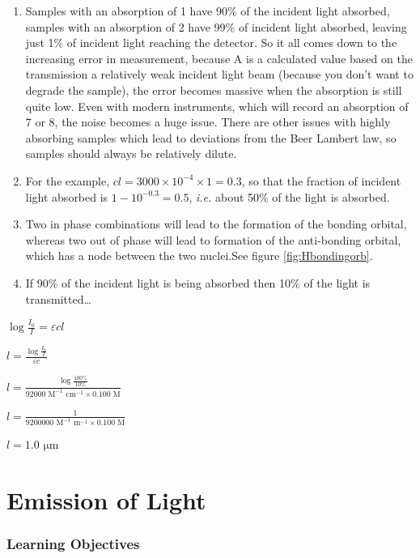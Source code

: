 \documentclass[
]{book}
\begin{document}
\begin{enumerate}
\def\labelenumi{\arabic{enumi}.}
\setcounter{enumi}{4}
\item
  Samples with an absorption of 1 have 90\% of the incident light absorbed, samples with an absorption of 2 have 99\% of incident light absorbed, leaving just 1\% of incident light reaching the detector. So it all comes down to the increasing error in measurement, because A is a calculated value based on the transmission a relatively weak incident light beam (because you don't want to degrade the sample), the error becomes massive when the absorption is still quite low. Even with modern instruments, which will record an absorption of 7 or 8, the noise becomes a huge issue. There are other issues with highly absorbing samples which lead to deviations from the Beer Lambert law, so samples should always be relatively dilute.
\item
  For the example, \(cl = 3000 \times 10^{-4} \times 1 = 0.3\), so that the fraction of incident light absorbed is
  \(1 - 10^{-0.3} = 0.5\), \emph{i.e.} about 50\% of the light is absorbed.
\item
  Two in phase combinations will lead to the formation of the bonding orbital, whereas two out of phase will lead to formation of the anti-bonding orbital, which has a node between the two nuclei.See figure \ref{fig:Hbondingorb}.
\item
  If 90\% of the incident light is being absorbed then 10\% of the light is transmitted\ldots{}
\end{enumerate}

\(\log \frac{I_0}{I}=\varepsilon cl\)

\(l=\frac{ \log \frac{I_0}{I}}{\varepsilon c}\)

\(l=\frac{\log \frac{100 \%}{10 \%}}{92000 \textrm{ M}^{−1} \textrm{ cm}^{−1} \times 0.100 \textrm{ M}}\)

\(l=\frac{1}{9200000 \textrm{ M}^{−1} \textrm{ m}^{−1} \times 0.100 \textrm{ M}}\)

\(l = 1.0 \textrm{ μm}\)

\hypertarget{chEm}{%
\chapter{Emission of Light}\label{chEm}}

\hypertarget{sec:EmLOs}{%
\subsection{Learning Objectives}\label{sec:EmLOs}}
\end{document}
